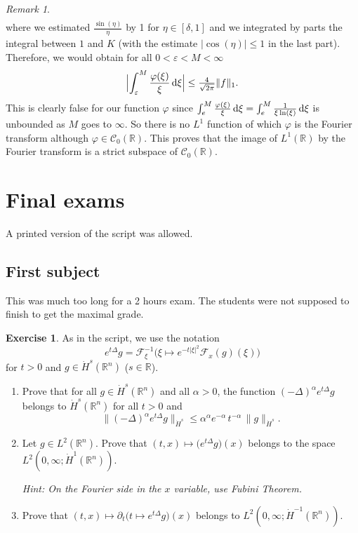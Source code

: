\documentclass[a4paper, 12pt]{article}
\theoremstyle{plain}
\theoremstyle{definition}
\newtheorem{exercise}{Exercise}
\theoremstyle{remark}
\newtheorem{remark}[proposition]{Remark}
\numberwithin{equation}{section}
\begin{document}
\begin{remark}
\begin{align*}
\end{align*}
%
where we estimated $\frac{\sin (\eta)}{\eta}$ by 1 for $\eta\in[\delta,1]$ and we integrated by parts the integral between $1$ and
$K$ (with the estimate $|\cos(\eta)|\le 1$ in the last part). Therefore, we would obtain for all $0<\varepsilon<M<\infty$
\[
\Bigl|\int_\varepsilon^M\frac{\varphi(\xi)}{\xi}\,{\rm d}\xi \Bigr|\le \tfrac{4}{\sqrt{2\pi}}\|f\|_1.
\]
This is clearly false for our function $\varphi$
since $\int_e^M\frac{\varphi(\xi)}{\xi}\,{\rm d}\xi=\int_e^M\frac{1}{\xi\ln(\xi)}\,{\rm d}\xi$ is unbounded as $M$ goes to $\infty$.
So there is no $L^1$ function of which $\varphi$ is the Fourier transform although $\varphi\in {\mathscr{C}}_0({\mathds{R}})$.
This proves that the image of $L^1({\mathds{R}})$ by the Fourier transform is a strict subspace of ${\mathscr{C}}_0({\mathds{R}})$.
\end{remark}

\section{Final exams}

A printed version of the script was allowed.

\subsection{First subject}

This was much too long for a 2 hours exam. The students were not supposed to finish to get the maximal grade.

\begin{exercise}
As in the script, we use the notation 
 \[
 e^{t\Delta}g={\mathscr{F}}_\xi^{-1}\bigl(\xi\mapsto e^{-t|\xi|^2}{\mathscr{F}}_x(g)(\xi)\bigr)
 \] 
 for $t>0$ and $g\in \dot H^s({\mathds{R}}^n)$ ($s\in {\mathds{R}}$).
%
\begin{enumerate}
\item 
Prove that for all $g\in \dot H^s({\mathds{R}}^n)$ and all $\alpha>0$, the function $(-\Delta)^\alpha e^{t\Delta}g$ belongs
to $\dot H^s({\mathds{R}}^n)$ for all $t>0$ and
\[
\|(-\Delta)^\alpha e^{t\Delta}g \|_{\dot H^s}\le \alpha^\alpha e^{-\alpha} \, t^{-\alpha}\,\|g\|_{\dot H^s}.
\]
\item 
Let $g\in L^2({\mathds{R}}^n)$. Prove that $(t,x)\mapsto \bigl(e^{t\Delta}g\bigr)(x)$ 
belongs to the space $L^2(0,\infty;\dot H^1({\mathds{R}}^n))$.

{\small\sl Hint: On the Fourier side in the $x$ variable, use Fubini Theorem.}
\item 
Prove that $(t,x)\mapsto \partial_t\bigl(t\mapsto e^{t\Delta}g\bigr)(x)$ belongs to $L^2(0,\infty;\dot H^{-1}({\mathds{R}}^n))$.
\end{enumerate}
\end{exercise}
\end{document}
